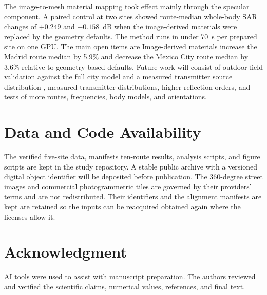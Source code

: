 \documentclass{IEEEoj} %
\providecommand{\DIFadd}[1]{{\protect\color{blue} \sf #1}} %
\providecommand{\DIFdel}[1]{{\protect\color{red} \scriptsize #1}} %
\providecommand{\DIFaddbegin}{} %
\providecommand{\DIFaddend}{} %
\providecommand{\DIFdelbegin}{} %
\providecommand{\DIFdelend}{} %
\begin{document}
\DIFdelbegin \DIFdel{The image-to-mesh material mapping took effect mainly through the specular
component. A paired control at two sites showed route-median whole-body SAR
changes of $+0.249$ and $-0.158$~dB when the image-derived materials were
replaced by the geometry defaults.
The method runs in under 70~s per prepared
site on one GPU. The main open items are }\DIFdelend \DIFaddbegin \DIFadd{Image-derived materials increase the Madrid route median by 5.9\% and decrease
the Mexico City route median by 3.6\% relative to geometry-based defaults.
Future work will consist of }\DIFaddend outdoor field validation\DIFdelbegin \DIFdel{against the
full city model and a measured transmitter
source distribution}\DIFdelend \DIFaddbegin \DIFadd{, measured transmitter
distributions, higher reflection orders, and tests of more routes, frequencies,
body models, and orientations}\DIFaddend .

\section*{Data and Code Availability}

The \DIFdelbegin \DIFdel{verified five-site data, manifests}\DIFdelend \DIFaddbegin \DIFadd{ten-route results}\DIFaddend , analysis scripts, and figure scripts are kept in the
study repository. A stable public archive with a versioned digital object
identifier will be deposited before publication. The 360-degree street images
and commercial photogrammetric tiles are governed by their providers' terms and
are not redistributed. Their identifiers \DIFdelbegin \DIFdel{and the alignment
manifests are kept }\DIFdelend \DIFaddbegin \DIFadd{are retained }\DIFaddend so the inputs can be
\DIFdelbegin \DIFdel{reacquired }\DIFdelend \DIFaddbegin \DIFadd{obtained again }\DIFaddend where the licenses allow it.

\section*{Acknowledgment}

AI tools were used to assist with manuscript preparation. The authors reviewed
and verified the scientific claims, numerical values, references, and final
text.
\end{document}
